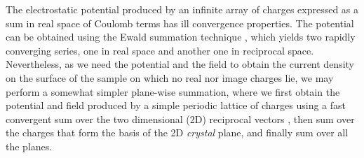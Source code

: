 \documentclass[review,sort&compress]{cas-sc}
\begin{document}
The electrostatic potential produced by an infinite array of
charges expressed as a sum in real space of Coulomb terms has ill
convergence properties. The potential can be obtained
using the Ewald summation technique
\cite{ewald1921calculation, belhadj1991molecular-dynamics,
  schmidt1997multipole, grzybowski2000ewald, toukmaji2000efficient,
  brodka2004ewald, campione2012ewald}, which yields
two rapidly converging series, one in real space and another one in reciprocal space.
Nevertheless, as we need the potential and the field to obtain the
current density on the surface of the sample on which  no
real nor image charges lie, we may perform a somewhat simpler plane-wise
summation, where we first obtain the potential and field produced by a
simple periodic lattice of charges using a fast convergent sum over
the two dimensional (2D)
reciprocal vectors \cite{nijboer1957calculation, nijboer1958internal,
  de_wette1965internal, watson1981madelung, grindlay1981k},
then sum over the charges that form the basis
of the 2D {\em crystal} plane, and finally sum over all the
planes.
\end{document}
